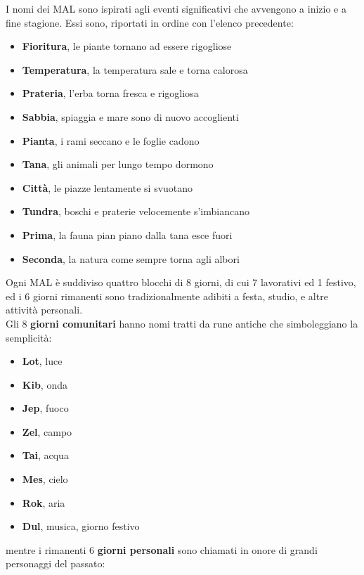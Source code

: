 \documentclass[10pt,twoside,onecolumn,openany]{book}
\begin{document}
I nomi dei MAL sono ispirati agli eventi significativi che avvengono a inizio e a fine stagione. Essi sono, riportati in ordine con l'elenco precedente:
\begin{multicols}{2}
\begin{itemize}
\item \textbf{Fioritura}, le piante tornano ad essere rigogliose
\item \textbf{Temperatura}, la temperatura sale e torna calorosa
\item \textbf{Prateria}, l'erba torna fresca e rigogliosa
\item \textbf{Sabbia}, spiaggia e mare sono di nuovo accoglienti
\item \textbf{Pianta}, i rami seccano e le foglie cadono
\item \textbf{Tana}, gli animali per lungo tempo dormono
\item \textbf{Città}, le piazze lentamente si svuotano
\item \textbf{Tundra}, boschi e praterie velocemente s'imbiancano
\item \textbf{Prima}, la fauna pian piano dalla tana esce fuori
\item \textbf{Seconda}, la natura come sempre torna agli albori
\end{itemize}
\end{multicols}
Ogni MAL è suddiviso quattro blocchi di 8 giorni, di cui 7 lavorativi ed 1 festivo, ed i 6 giorni rimanenti sono tradizionalmente adibiti a festa, studio, e altre attività personali.\\
Gli 8 \textbf{giorni comunitari} hanno nomi tratti da rune antiche che simboleggiano la semplicità:
\begin{multicols}{2}
\begin{itemize}
\item \textbf{Lot}, luce
\item \textbf{Kib}, onda
\item \textbf{Jep}, fuoco
\item \textbf{Zel}, campo
\item \textbf{Tai}, acqua
\item \textbf{Mes}, cielo
\item \textbf{Rok}, aria
\item \textbf{Dul}, musica, giorno festivo
\end{itemize}
\end{multicols}
mentre i rimanenti 6 \textbf{giorni personali} sono chiamati in onore di grandi personaggi del passato:
\end{document}
